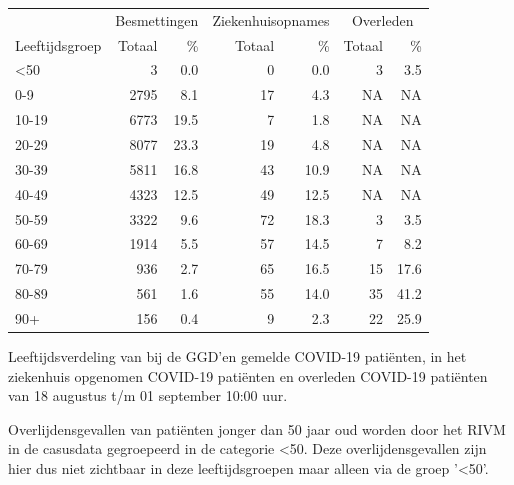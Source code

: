 \documentclass[
  english,
  man,floatsintext]{apa6}
\begin{document}
\begin{table}
\centering\begingroup\fontsize{11}{13}\selectfont

\begin{threeparttable}
\begin{tabular}{lrrrrrr}
\toprule
\multicolumn{1}{c}{ } & \multicolumn{2}{c}{Besmettingen} & \multicolumn{2}{c}{Ziekenhuisopnames} & \multicolumn{2}{c}{Overleden} \\
\cmidrule(l{3pt}r{3pt}){2-3} \cmidrule(l{3pt}r{3pt}){4-5} \cmidrule(l{3pt}r{3pt}){6-7}
Leeftijdsgroep & Totaal & \% & Totaal & \% & Totaal & \%\\
\midrule
<50 & 3 & 0.0 & 0 & 0.0 & 3 & 3.5\\
0-9 & 2795 & 8.1 & 17 & 4.3 & NA & NA\\
10-19 & 6773 & 19.5 & 7 & 1.8 & NA & NA\\
20-29 & 8077 & 23.3 & 19 & 4.8 & NA & NA\\
30-39 & 5811 & 16.8 & 43 & 10.9 & NA & NA\\
40-49 & 4323 & 12.5 & 49 & 12.5 & NA & NA\\
50-59 & 3322 & 9.6 & 72 & 18.3 & 3 & 3.5\\
60-69 & 1914 & 5.5 & 57 & 14.5 & 7 & 8.2\\
70-79 & 936 & 2.7 & 65 & 16.5 & 15 & 17.6\\
80-89 & 561 & 1.6 & 55 & 14.0 & 35 & 41.2\\
90+ & 156 & 0.4 & 9 & 2.3 & 22 & 25.9\\
\bottomrule
\end{tabular}
\begin{tablenotes}
\item[1] Leeftijdsverdeling van bij de GGD’en gemelde COVID-19 patiënten, in het ziekenhuis opgenomen COVID-19 patiënten en overleden COVID-19 patiënten van 18 augustus t/m 01 september 10:00 uur.
\item[2] Overlijdensgevallen van patiënten jonger dan 50 jaar oud worden door het RIVM in de casusdata gegroepeerd in de categorie <50. Deze overlijdensgevallen zijn hier dus niet zichtbaar in deze leeftijdsgroepen maar alleen via de groep '<50'.
\end{tablenotes}
\end{threeparttable}
\endgroup{}
\end{table}

\newpage
\end{document}
